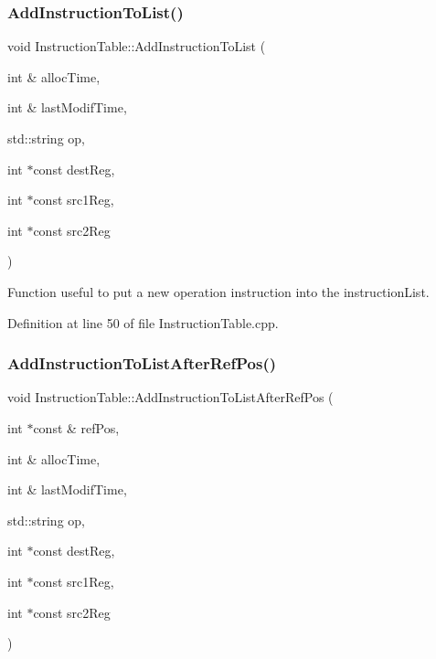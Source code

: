 \subsubsection{\texorpdfstring{Add\+Instruction\+To\+List()}{AddInstructionToList()}}
{\footnotesize\ttfamily void Instruction\+Table\+::\+Add\+Instruction\+To\+List (\begin{DoxyParamCaption}\item[{int \&}]{alloc\+Time,  }\item[{int \&}]{last\+Modif\+Time,  }\item[{std\+::string}]{op,  }\item[{int $\ast$const}]{dest\+Reg,  }\item[{int $\ast$const}]{src1\+Reg,  }\item[{int $\ast$const}]{src2\+Reg }\end{DoxyParamCaption})}



Function useful to put a new operation instruction into the instruction\+List. 



Definition at line 50 of file Instruction\+Table.\+cpp.

\mbox{\label{classoctantis_1_1InstructionTable_a54996f84d677ac20e1edec8682aabcea}} 
\subsubsection{\texorpdfstring{Add\+Instruction\+To\+List\+After\+Ref\+Pos()}{AddInstructionToListAfterRefPos()}}
{\footnotesize\ttfamily void Instruction\+Table\+::\+Add\+Instruction\+To\+List\+After\+Ref\+Pos (\begin{DoxyParamCaption}\item[{int $\ast$const \&}]{ref\+Pos,  }\item[{int \&}]{alloc\+Time,  }\item[{int \&}]{last\+Modif\+Time,  }\item[{std\+::string}]{op,  }\item[{int $\ast$const}]{dest\+Reg,  }\item[{int $\ast$const}]{src1\+Reg,  }\item[{int $\ast$const}]{src2\+Reg }\end{DoxyParamCaption})}



